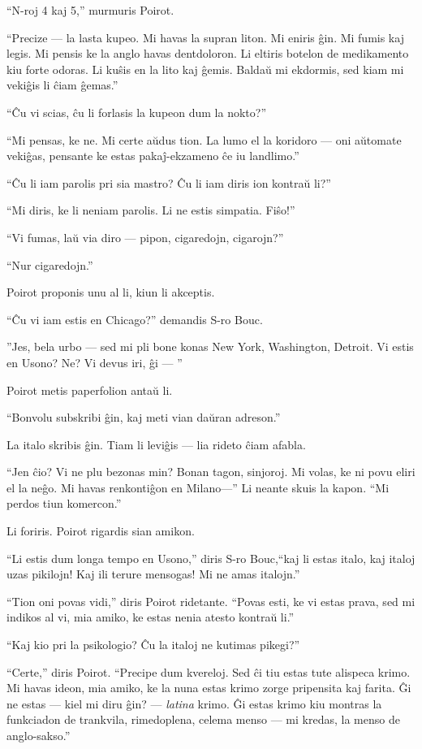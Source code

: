 ``N-roj 4 kaj 5,'' murmuris Poirot.

``Precize --- la lasta kupeo. Mi havas la supran liton. Mi eniris ĝin. Mi fumis kaj legis. Mi pensis ke la anglo havas dentdoloron. Li eltiris botelon de medikamento kiu forte odoras. Li kuŝis en la lito kaj ĝemis. Baldaŭ mi ekdormis, sed kiam mi vekiĝis li ĉiam ĝemas.''

``Ĉu vi scias, ĉu li forlasis la kupeon dum la nokto?''

``Mi pensas, ke ne. Mi certe aŭdus tion. La lumo el la koridoro --- oni aŭtomate vekiĝas, pensante ke estas pakaĵ-ekzameno ĉe iu landlimo.''

``Ĉu li iam parolis pri sia mastro? Ĉu li iam diris ion kontraŭ li?''

``Mi diris, ke li neniam parolis. Li ne estis simpatia. Fiŝo!''

``Vi fumas, laŭ via diro --- pipon, cigaredojn, cigarojn?''

``Nur cigaredojn.''

Poirot proponis unu al li, kiun li akceptis.

``Ĉu vi iam estis en Chicago?'' demandis S-ro Bouc.

''Jes, bela urbo --- sed mi pli bone konas New York, Washington, Detroit. Vi estis en Usono? Ne? Vi devus iri, ĝi --- ''

Poirot metis paperfolion antaŭ li.

``Bonvolu subskribi ĝin, kaj meti vian daŭran adreson.''

La italo skribis ĝin. Tiam li leviĝis --- lia rideto ĉiam afabla.

``Jen ĉio? Vi ne plu bezonas min? Bonan tagon, sinjoroj. Mi volas, ke ni povu eliri el la neĝo. Mi havas renkontiĝon en Milano---'' Li neante skuis la kapon. ``Mi perdos tiun komercon.''

Li foriris. Poirot rigardis sian amikon.

``Li estis dum longa tempo en Usono,'' diris S-ro Bouc,``kaj li estas italo, kaj italoj uzas pikilojn! Kaj ili terure mensogas! Mi ne amas italojn.''

``Tion oni povas vidi,'' diris Poirot ridetante. ``Povas esti, ke vi estas prava, sed mi indikos al vi, mia amiko, ke estas nenia atesto kontraŭ li.''

``Kaj kio pri la psikologio? Ĉu la italoj ne kutimas pikegi?''

``Certe,'' diris Poirot. ``Precipe dum kvereloj. Sed ĉi tiu estas tute alispeca krimo. Mi havas ideon, mia amiko, ke la nuna estas krimo zorge pripensita kaj farita. Ĝi ne estas --- kiel mi diru ĝin? --- \emph{latina} krimo. Ĝi estas krimo kiu montras la funkciadon de trankvila, rimedoplena, celema menso --- mi kredas, la menso de anglo-sakso.''


